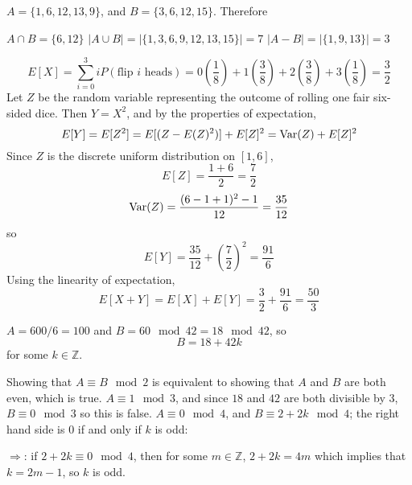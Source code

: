 \documentclass[12pt,twoside]{article}
\begin{document}

\begin{problems}

\problem  $A = \{ 1, 6, 12, 13, 9 \}$, and $B = \{ 3, 6, 12, 15 \}$. Therefore

\begin{problemparts}
\problempart $A \cap B = \{ 6, 12 \}$
\problempart $|A \cup B| = |\{ 1, 3, 6, 9, 12, 13, 15 \}| = 7$
\problempart $|A - B| = |\{ 1, 9, 13 \}| = 3$
\end{problemparts}

\problem  %

\begin{problemparts}
\problempart
$$
E[X] = \sum_{i = 0}^3 iP(\text{flip }i\text{ heads}) = 0\left(\frac{1}{8}\right) + 1\left(\frac{3}{8}\right) + 2\left(\frac{3}{8}\right) + 3\left(\frac{1}{8}\right) = \frac{3}{2}
$$
\problempart Let $Z$ be the random variable representing the outcome of rolling one fair six-sided dice. Then $Y = X^2$, and by the properties of expectation,
$$
E[Y] = E[Z^2] = E[(Z - E(Z)^2)] + E[Z]^2 = \mathop{\rm Var}\nolimits(Z) + E[Z]^2
$$
Since $Z$ is the discrete uniform distribution on $[1, 6]$, 
$$
E[Z] = \frac{1 + 6}{2} = \frac{7}{2}
$$
$$
\mathop{\rm Var}\nolimits(Z) = \frac{(6 - 1 + 1)^2 - 1}{12} = \frac{35}{12}
$$
so 
$$
E[Y] = \frac{35}{12} + \left(\frac{7}{2}\right)^2 = \frac{91}{6}
$$
\problempart Using the linearity of expectation,
$$
E[X + Y] = E[X] + E[Y] = \frac{3}{2} + \frac{91}{6} = \frac{50}{3}
$$
\end{problemparts}

\problem $A = 600/6 = 100$ and $B = 60 \mod 42 = 18 \mod 42$, so
$$
B = 18 + 42k
$$
for some $k \in \mathbb{Z}$.

\begin{problemparts}
\problempart Showing that $A \equiv B \mod 2$ is equivalent to showing that $A$ and $B$ are both even, which is true.
\problempart $A \equiv 1 \mod 3$, and since $18$ and $42$ are both divisible by $3$, $B \equiv 0 \mod 3$ so this is false.
\problempart $A \equiv 0 \mod 4$, and $B \equiv 2 + 2k \mod 4$; the right hand side is $0$ if and only if $k$ is odd:

$\Rightarrow$: if $2 + 2k \equiv 0 \mod 4$, then for some $m \in \mathbb{Z}$, $2 + 2k = 4m$ which implies that $k = 2m - 1$, so $k$ is odd.


\end{problemparts}
\end{problems}
\end{document}
